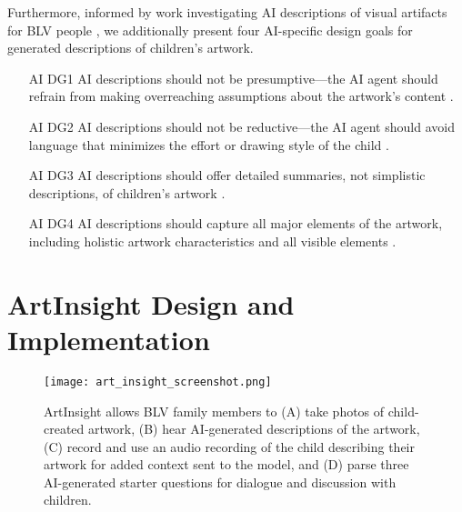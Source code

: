 \documentclass[sigconf]{acmart}
\begin{document}
Furthermore, informed by work investigating AI descriptions of visual artifacts for BLV people \cite{bennett_itscomplicated, Kim_DescriptionsForComics, Das_ProvenanceToAberrations, chhedakothary2024}, we additionally present four AI-specific design goals for generated descriptions of children's artwork.

\begin{itemize}
    \item[AI DG1] AI descriptions should not be presumptive---the AI agent should refrain from making overreaching assumptions about the artwork's content \cite{chhedakothary2024, bennett_itscomplicated}.
    \item[AI DG2] AI descriptions should not be reductive---the AI agent should avoid language that minimizes the effort or drawing style of the child \cite{chhedakothary2024}.
    \item[AI DG3] AI descriptions should offer detailed summaries, not simplistic descriptions, of children's artwork \cite{Das_ProvenanceToAberrations, Kim_DescriptionsForComics}.
    \item[AI DG4] AI descriptions should capture all major elements of the artwork, including holistic artwork characteristics and all visible elements \cite{chhedakothary2024}.
\end{itemize}

\section{ArtInsight Design and Implementation}

\begin{figure*}[h]
\centering
\texttt{[image: art\_insight\_screenshot.png]}
\caption{ArtInsight allows BLV family members to (A) take photos of child-created artwork, (B) hear AI-generated descriptions of the artwork, (C) record and use an audio recording of the child describing their artwork for added context sent to the model, and (D) parse three AI-generated starter questions for dialogue and discussion with children.}
\label{System}
\vspace{-0.5em}
\end{figure*}
\end{document}
